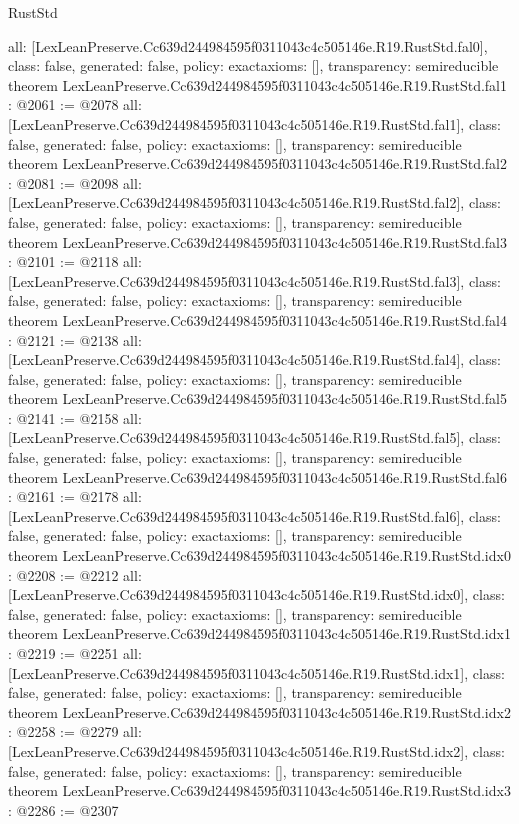 \begin{lexlean}{RustStd}
\begin{coremodule}
{  all: [LexLeanPreserve.Cc639d244984595f0311043c4c505146e.R19.RustStd.fal0],
  class: false,
  generated: false,
  policy: exact{axioms: []},
  transparency: semireducible
}
theorem LexLeanPreserve.Cc639d244984595f0311043c4c505146e.R19.RustStd.fal1 : @2061 := @2078 {
  all: [LexLeanPreserve.Cc639d244984595f0311043c4c505146e.R19.RustStd.fal1],
  class: false,
  generated: false,
  policy: exact{axioms: []},
  transparency: semireducible
}
theorem LexLeanPreserve.Cc639d244984595f0311043c4c505146e.R19.RustStd.fal2 : @2081 := @2098 {
  all: [LexLeanPreserve.Cc639d244984595f0311043c4c505146e.R19.RustStd.fal2],
  class: false,
  generated: false,
  policy: exact{axioms: []},
  transparency: semireducible
}
theorem LexLeanPreserve.Cc639d244984595f0311043c4c505146e.R19.RustStd.fal3 : @2101 := @2118 {
  all: [LexLeanPreserve.Cc639d244984595f0311043c4c505146e.R19.RustStd.fal3],
  class: false,
  generated: false,
  policy: exact{axioms: []},
  transparency: semireducible
}
theorem LexLeanPreserve.Cc639d244984595f0311043c4c505146e.R19.RustStd.fal4 : @2121 := @2138 {
  all: [LexLeanPreserve.Cc639d244984595f0311043c4c505146e.R19.RustStd.fal4],
  class: false,
  generated: false,
  policy: exact{axioms: []},
  transparency: semireducible
}
theorem LexLeanPreserve.Cc639d244984595f0311043c4c505146e.R19.RustStd.fal5 : @2141 := @2158 {
  all: [LexLeanPreserve.Cc639d244984595f0311043c4c505146e.R19.RustStd.fal5],
  class: false,
  generated: false,
  policy: exact{axioms: []},
  transparency: semireducible
}
theorem LexLeanPreserve.Cc639d244984595f0311043c4c505146e.R19.RustStd.fal6 : @2161 := @2178 {
  all: [LexLeanPreserve.Cc639d244984595f0311043c4c505146e.R19.RustStd.fal6],
  class: false,
  generated: false,
  policy: exact{axioms: []},
  transparency: semireducible
}
theorem LexLeanPreserve.Cc639d244984595f0311043c4c505146e.R19.RustStd.idx0 : @2208 := @2212 {
  all: [LexLeanPreserve.Cc639d244984595f0311043c4c505146e.R19.RustStd.idx0],
  class: false,
  generated: false,
  policy: exact{axioms: []},
  transparency: semireducible
}
theorem LexLeanPreserve.Cc639d244984595f0311043c4c505146e.R19.RustStd.idx1 : @2219 := @2251 {
  all: [LexLeanPreserve.Cc639d244984595f0311043c4c505146e.R19.RustStd.idx1],
  class: false,
  generated: false,
  policy: exact{axioms: []},
  transparency: semireducible
}
theorem LexLeanPreserve.Cc639d244984595f0311043c4c505146e.R19.RustStd.idx2 : @2258 := @2279 {
  all: [LexLeanPreserve.Cc639d244984595f0311043c4c505146e.R19.RustStd.idx2],
  class: false,
  generated: false,
  policy: exact{axioms: []},
  transparency: semireducible
}
theorem LexLeanPreserve.Cc639d244984595f0311043c4c505146e.R19.RustStd.idx3 : @2286 := @2307 {
}
\end{coremodule}
\end{lexlean}
